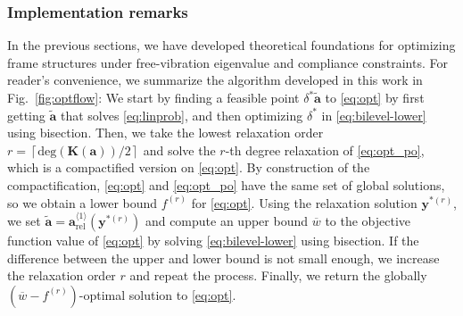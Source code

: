 \documentclass[final,onefignum,onetabnum]{siamart220329}
\begin{document}
\subsubsection{Implementation remarks} 
In the previous sections, we have developed theoretical foundations for optimizing frame structures under free-vibration eigenvalue and compliance constraints. {For reader's convenience, we summarize the algorithm developed in this work in Fig.~\ref{fig:optflow}: We start by finding a feasible point $\delta^*\tilde{\mathbf{a}}$ to \eqref{eq:opt} by first getting $\tilde{\mathbf{a}}$ that solves \eqref{eq:linprob}, and then optimizing $\delta^*$ in \eqref{eq:bilevel-lower} using bisection. Then, we take the lowest relaxation order $r = \left\lceil \mathrm{deg}(\mathbf{K}(\mathbf{a}))/2 \right\rceil$ and solve the $r$-th degree relaxation of \eqref{eq:opt_po}, which is a compactified version on \eqref{eq:opt}. By construction of the compactification, \eqref{eq:opt} and \eqref{eq:opt_po} have the same set of global solutions, so we obtain a lower bound $f^{(r)}$ for \eqref{eq:opt}. Using the relaxation solution $\mathbf{y}^{*(r)}$, we set $\tilde{\mathbf{a}} = \mathbf{a}_{\mathrm{rel}}^{\langle 1\rangle}(\mathbf{y}^{*(r)})$ and compute an upper bound $\overline{w}$ to the objective function value of \eqref{eq:opt} by solving \eqref{eq:bilevel-lower} using bisection. If the difference between the upper and lower bound is not small enough, we increase the relaxation order $r$ and repeat the process. Finally, we return the globally $(\overline{w}-f^{(r)})$-optimal solution to \eqref{eq:opt}.}
%
\end{document}
